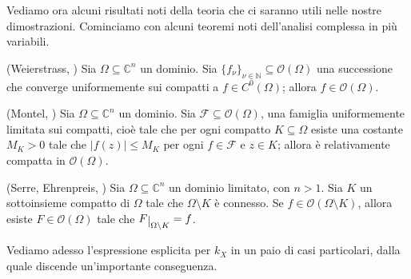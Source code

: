 Vediamo ora alcuni risultati noti della teoria che ci saranno utili nelle nostre dimostrazioni. Cominciamo con alcuni teoremi noti dell'analisi complessa in più variabili.

\begin{thm}
    (Weierstrass, \cite[Chapter 1, Proposition 5]{N}) Sia $\Omega \subseteq \mathbb{C}^n$ un dominio. Sia $\{f_{\nu}\}_{\nu\in\mathbb{N}} \subseteq \mathcal{O}(\Omega)$ una successione che converge uniformemente sui compatti a $f\in C^0(\Omega)$; allora $f\in\mathcal{O}(\Omega)$.
\end{thm}

\begin{thm}
    (Montel, \cite[Chapter 1, Proposition 6]{N}) Sia $\Omega \subseteq \mathbb{C}^n$ un dominio. Sia $\mathcal{F}\subseteq\mathcal{O}(\Omega)$, una famiglia uniformemente limitata sui compatti, cioè tale che per ogni compatto $K\subseteq\Omega$ esiste una costante $M_K>0$ tale che $|f(z)|\le M_K$ per ogni $f\in\mathcal{F}$ e $z\in K$; allora è relativamente compatta in $\mathcal{O}(\Omega)$.
\end{thm}

\begin{thm} \label{hartogs_fen}
    (Serre, Ehrenpreis, \cite[Theorem 1.2.6]{Kr}) Sia $\Omega \subseteq \mathbb{C}^n$ un dominio limitato, con $n>1$. Sia $K$ un sottoinsieme compatto di $\Omega$ tale che $\Omega\setminus K$ è connesso. Se $f\in\mathcal{O}(\Omega\setminus K)$, allora esiste $F\in\mathcal{O}(\Omega)$ tale che $F\restrict{\Omega\setminus K}=f$.
\end{thm}

Vediamo adesso l'espressione esplicita per $k_X$ in un paio di casi particolari, dalla quale discende un'importante conseguenza.

